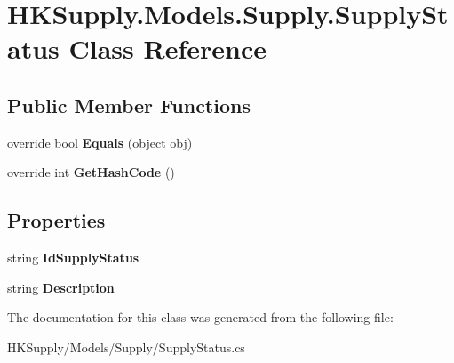 \hypertarget{class_h_k_supply_1_1_models_1_1_supply_1_1_supply_status}{}\section{H\+K\+Supply.\+Models.\+Supply.\+Supply\+Status Class Reference}
\label{class_h_k_supply_1_1_models_1_1_supply_1_1_supply_status}
\subsection*{Public Member Functions}
\begin{DoxyCompactItemize}
\item 
\mbox{\label{class_h_k_supply_1_1_models_1_1_supply_1_1_supply_status_a12663abf765aabbdebed547f6c1080d7}} 
override bool {\bfseries Equals} (object obj)
\item 
\mbox{\label{class_h_k_supply_1_1_models_1_1_supply_1_1_supply_status_a580bda5f856404107cbd29c5accf20b6}} 
override int {\bfseries Get\+Hash\+Code} ()
\end{DoxyCompactItemize}
\subsection*{Properties}
\begin{DoxyCompactItemize}
\item 
\mbox{\label{class_h_k_supply_1_1_models_1_1_supply_1_1_supply_status_a314cdb7fabbd1cc36daac04d79273eef}} 
string {\bfseries Id\+Supply\+Status}
\item 
\mbox{\label{class_h_k_supply_1_1_models_1_1_supply_1_1_supply_status_abf3003aad78145385454b57478ce5d5c}} 
string {\bfseries Description}
\end{DoxyCompactItemize}


The documentation for this class was generated from the following file\+:\begin{DoxyCompactItemize}
\item 
H\+K\+Supply/\+Models/\+Supply/Supply\+Status.\+cs\end{DoxyCompactItemize}

